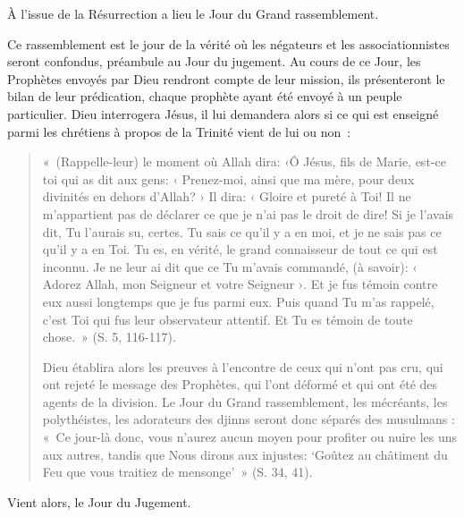 À l'issue de la Résurrection a lieu le Jour du Grand rassemblement.


Ce rassemblement est le jour de la vérité où les négateurs et les
associationnistes seront confondus, préambule au Jour du jugement. Au
cours de ce Jour, les Prophètes envoyés par Dieu rendront compte de leur
mission, ils présenteront le bilan de leur prédication, chaque prophète
ayant été envoyé à un peuple particulier. Dieu interrogera Jésus, il lui
demandera alors si ce qui est enseigné parmi les chrétiens à propos de
la Trinité vient de lui ou non~:
\begin{quote}
    
«~(Rappelle-leur) le moment où Allah dira: ‹Ô Jésus, fils de Marie,
est-ce toi qui as dit aux gens: ‹ Prenez-moi, ainsi que ma mère, pour
deux divinités en dehors d'Allah? › Il dira: ‹ Gloire et pureté à Toi!
Il ne m'appartient pas de déclarer ce que je n'ai pas le droit de dire!
Si je l'avais dit, Tu l'aurais su, certes. Tu sais ce qu'il y a en moi,
et je ne sais pas ce qu'il y a en Toi. Tu es, en vérité, le grand
connaisseur de tout ce qui est inconnu. Je ne leur ai dit que ce Tu
m'avais commandé, (à savoir): ‹ Adorez Allah, mon Seigneur et votre
Seigneur ›. Et je fus témoin contre eux aussi longtemps que je fus parmi
eux. Puis quand Tu m'as rappelé, c'est Toi qui fus leur observateur
attentif. Et Tu es témoin de toute chose.~» (S. 5, 116-117).

Dieu établira alors les preuves à l'encontre de ceux qui n'ont pas cru,
qui ont rejeté le message des Prophètes, qui l'ont déformé et qui ont
été des agents de la division. Le Jour du Grand rassemblement, les
mécréants, les polythéistes, les adorateurs des djinns seront donc
séparés des musulmans : «~Ce jour-là donc, vous n'aurez aucun moyen pour
profiter ou nuire les uns aux autres, tandis que Nous dirons aux
injustes: `Goûtez au châtiment du Feu que vous traitiez de mensonge'~»
(S. 34, 41).
\end{quote}

Vient alors, le Jour du Jugement.


